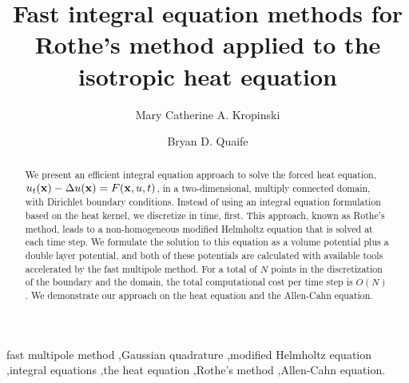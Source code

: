 \documentclass[preprint,12pt]{elsarticle}
\newcommand{\x}{{\bf x}}
\begin{document}




\begin{frontmatter}

\title{Fast integral equation methods for Rothe's method applied to the isotropic heat equation}
 \author{Mary Catherine A. Kropinski}
 \author{Bryan D. Quaife}
 \address[mcak]{Department of Mathematics, Simon Fraser University,
 Burnaby, British Columbia, Canada V5A 1S6}

\begin{abstract}
We present an efficient integral equation approach to solve the forced heat equation, $u_t (\x) - \Delta u(\x) = F(\x, u, t)$, in a two-dimensional, multiply connected domain, with Dirichlet boundary conditions. Instead of using an integral equation formulation based on the heat kernel, we discretize in time, first. This approach, known as Rothe's method, leads to a non-homogeneous modified Helmholtz equation that is solved at each time step. We formulate the solution to this equation as a volume potential plus a double layer potential, and both of these potentials are calculated with available tools accelerated by the fast multipole method. For a total of $N$ points in the discretization of the boundary and the domain, the total computational cost per time step is $O(N)$. We demonstrate our approach on the heat equation and the Allen-Cahn equation. 
\end{abstract}

\begin{keyword}
fast multipole method \sep Gaussian quadrature \sep modified Helmholtz
equation \sep integral equations \sep the heat equation \sep Rothe's method \sep Allen-Cahn equation.
\end{keyword}
\end{frontmatter}
\end{document}
